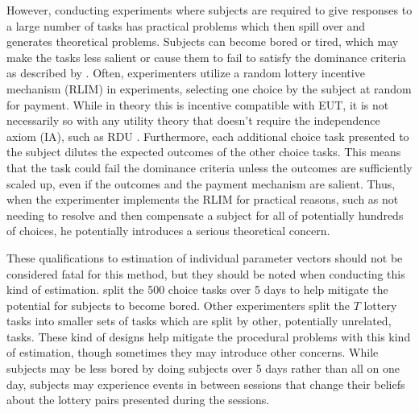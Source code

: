 \documentclass[../main.tex]{subfiles}
\begin{document}
\addtocounter{footnote}{-1}

However, conducting experiments where subjects are required to give responses to a large number of tasks has practical problems which then spill over and generates theoretical problems.
Subjects can become bored or tired, which may make the tasks less salient or cause them to fail to satisfy the dominance criteria as described by \textcite{Harrison1992}.
Often, experimenters utilize a random lottery incentive mechanism (RLIM) in experiments, selecting one choice by the subject at random for payment.
While in theory this is incentive compatible with EUT, it is not necessarily so with any utility theory that doesn't require the independence axiom (IA), such as RDU \parencite{Harrison2014, Cox2015}.
Furthermore, each additional choice task presented to the subject dilutes the expected outcomes of the other choice tasks.
This means that the task could fail the dominance criteria unless the outcomes are sufficiently scaled up, even if the outcomes and the payment mechanism are salient.
Thus, when the experimenter implements the RLIM for practical reasons, such as not needing to resolve and then compensate a subject for all of potentially hundreds of choices, he potentially introduces a serious theoretical concern.

These qualifications to estimation of individual parameter vectors should not be considered fatal for this method, but they should be noted when conducting this kind of estimation.
\textcite{Hey2001} split the 500 choice tasks over 5 days to help mitigate the potential for subjects to become bored.
Other experimenters split the $T$ lottery tasks into smaller sets of tasks which are split by other, potentially unrelated, tasks.
These kind of designs help mitigate the procedural problems with this kind of estimation, though sometimes they may introduce other concerns.
While subjects may be less bored by doing subjects over 5 days rather than all on one day, subjects may experience events in between sessions that change their beliefs about the lottery pairs presented during the sessions.
\end{document}

